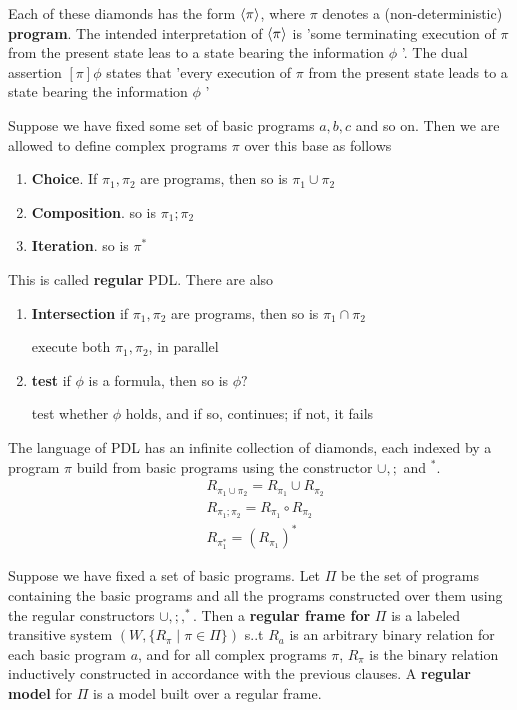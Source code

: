 \documentclass[11pt]{article}
\begin{document}
\begin{examplle}
Each of these diamonds has the form \(\langle\pi\rangle\), where \(\pi\) denotes a
(non-deterministic) \textbf{program}. The intended interpretation of \(\langle\pi\rangle\) is
'some terminating execution of \(\pi\) from the present state leas to a state
bearing the information \(\phi\) '. The dual assertion \([\pi]\phi\) states that
'every execution of \(\pi\) from the present state leads to a state bearing the
information \(\phi\) '

Suppose we have fixed some set of basic programs \(a,b,c\) and so on. Then we
are allowed to define complex programs \(\pi\) over this base as follows
\begin{enumerate}
\item \textbf{Choice}. If \(\pi_1,\pi_2\) are programs, then so is \(\pi_1\cup\pi_2\)
\item \textbf{Composition}. so is \(\pi_1;\pi_2\)
\item \textbf{Iteration}. so is \(\pi^*\)
\end{enumerate}


This is called \textbf{regular} PDL. There are also
\begin{enumerate}
\item \textbf{Intersection} if \(\pi_1,\pi_2\) are programs, then so is
\(\pi_1\cap\pi_2\)

execute both \(\pi_1,\pi_2\), in parallel

\item \textbf{test} if \(\phi\) is a formula, then so is \(\phi?\)

test whether \(\phi\) holds, and if so, continues; if not, it fails
\end{enumerate}

The language of PDL has an infinite collection of diamonds, each indexed by a
program \(\pi\) build from basic programs using the constructor \(\cup,;\) and
\(^*\).
\begin{align*}
 &R_{\pi_1\cup\pi_2}=R_{\pi_1}\cup R_{\pi_2}\\
 &R_{\pi_1;\pi_2}=R_{\pi_1}\circ R_{\pi_2}\\
 &R_{\pi_1^*}=(R_{\pi_1})^*
 \end{align*}

Suppose  we have fixed a set of basic programs. Let \(\Pi\) be the set of programs
containing the basic programs and all the programs constructed over them
using the regular constructors \(\cup,;,^*\). Then a \textbf{regular frame for} \(\Pi\) is
a labeled transitive system \((W,\{R_\pi\mid\pi\in\Pi\})\) s..t \(R_a\) is an
arbitrary binary  relation for each basic program \(a\), and for all complex
programs \(\pi\), \(R_{\pi}\) is the binary relation inductively constructed in
accordance with the previous clauses. A \textbf{regular model} for \(\Pi\) is a model built
over a regular frame.
\end{examplle}
\end{document}
